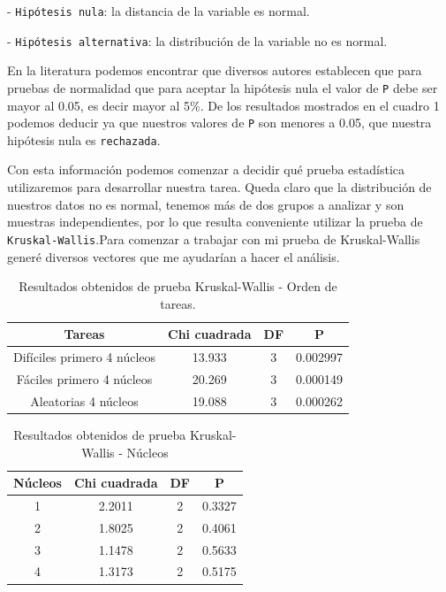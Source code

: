 \documentclass{article}
\begin{document}
- \texttt{Hip\'otesis nula}: la distancia de la variable es normal.

- \texttt{Hip\'otesis alternativa}: la distribuci\'on de la variable no es normal.

En la literatura podemos encontrar que diversos autores establecen que para pruebas de normalidad que para aceptar la hip\'otesis nula el valor de \texttt{P} debe ser mayor al 0.05, es decir mayor al 5\%. De los resultados mostrados en el cuadro 1 podemos deducir ya que nuestros valores de \texttt{P} son menores a 0.05, que nuestra hip\'otesis nula es \texttt{rechazada}.

Con esta informaci\'on podemos comenzar a decidir qu\'e prueba estad\'istica utilizaremos para desarrollar nuestra tarea.
Queda claro que la distribuci\'on de nuestros datos no es normal, tenemos m\'as de dos grupos a analizar y son muestras independientes, por lo que resulta conveniente utilizar  la prueba de \texttt{Kruskal-Wallis}\cite{SeleccionPruebas}.Para comenzar a trabajar con mi prueba de Kruskal-Wallis gener\'e diversos vectores que me ayudar\'ian a hacer el an\'alisis. 

\begin{table}[ht]
    \centering
    \caption{Resultados obtenidos de prueba Kruskal-Wallis - Orden de tareas.} 
    \begin{tabular}{|c|c|c|c|}
    \hline
    Tareas & Chi cuadrada & DF & P  \\
    \hline
    Dif\'iciles primero 4 n\'ucleos & 13.933 & 3 & 0.002997 \\
    \hline
    F\'aciles primero 4 n\'ucleos & 20.269 & 3 & 0.000149 \\
    \hline
    Aleatorias 4 n\'ucleos & 19.088 & 3 & 0.000262\\
    \hline
\end{tabular}
    \label{cuadro 3}
\end{table}
\begin{table}[ht]
    \centering
    \caption{Resultados obtenidos de prueba Kruskal-Wallis - N\'ucleos} 
    \begin{tabular}{|c|c|c|c|}
    \hline
    N\'ucleos & Chi cuadrada & DF & P  \\
    \hline
    1 & 2.2011 & 2 & 0.3327 \\
    \hline
    2 & 1.8025 & 2 & 0.4061 \\
    \hline
    3 & 1.1478 & 2 & 0.5633 \\
    \hline
    4 & 1.3173 & 2 & 0.5175 \\
    \hline
\end{tabular}
    \label{cuadro 4}
\end{table}
\end{document}
